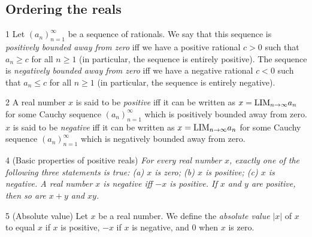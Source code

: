 \subsection{Ordering the reals}
\begin{definition}{1}
    \label{bounded-away-pos-neg}
    Let $(a_n)_{n=1}^{\infty}$ be a sequence of rationals. We say that this sequence
    is \emph{positively bounded away from zero} iff we have a positive rational
    $c > 0$ such that $a_n \geq c$ for all $n \geq 1$ (in particular, the sequence
    is entirely positive). The sequence is \emph{negatively bounded away from zero}
    iff we have a negative rational $c < 0$ such that $a_n \leq c$ for all $n \geq 1$
    (in particular, the sequence is entirely negative).
\end{definition}

\begin{definition}{2}
    \label{real-positive}
    A real number $x$ is said to be \emph{positive} iff it can be written as
    $x = \text{LIM}_{n \rightarrow \infty}{a_n}$ for some Cauchy sequence $(a_n)_{n=1}^{\infty}$ which
    is positively bounded away from zero. $x$ is said to be \emph{negative} iff
    it can be written as $x = \text{LIM}_{n \rightarrow \infty}{a_n}$ for some Cauchy sequence
    $(a_n)_{n=1}^{\infty}$ which is negatively bounded away from zero.
\end{definition}

\begin{proposition}{4}
    \label{real-positive-properties}
    (Basic properties of positive reals) \emph{For every real number $x$, exactly
    one of the following three statements is true: (a) $x$ is zero; (b) $x$ is
    positive; (c) $x$ is negative. A real number $x$ is negative iff $-x$ is positive.
    If $x$ and $y$ are positive, then so are $x + y$ and $xy$.}
\end{proposition}

\begin{definition}{5}
    \label{real-abs}
    (Absolute value) Let $x$ be a real number. We define the \emph{absolute value}
    $|x|$ of $x$ to equal $x$ if $x$ is positive, $-x$ if $x$ is negative, and $0$
    when $x$ is zero.
\end{definition}

